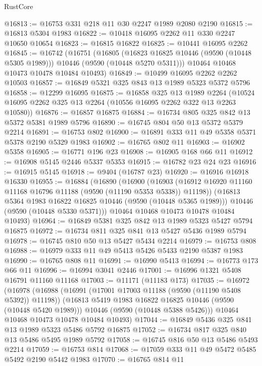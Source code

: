 \begin{lexlean}{RustCore}
\begin{coremodule}
@16813 := @16753 @331 @218 @11 @30 @2247 @1989 @2080 @2190
@16815 := @16813 @5304 @1983
@16822 := @10418 @16095 @2262 @11 @330 @2247 @10650 @10654
@16823 := @16815 @16822
@16825 := @10441 @16095 @2262
@16845 := @16742
    (@16751
      (@16805
        (@16823 @16825 @10446 (@9590 (@10448 @5305 @1989)))
        @10446
        (@9590 (@10448 @5270 @5311)))
      @10464
      @10468
      @10473
      @10478
      @10484
      @10493)
@16849 := @10499 @16095 @2262 @2262 @10503
@16857 := @16849 @5321 @325 @843 @13 @1989 @5323 @5372 @5796
@16858 := @12299 @16095
@16875 := @16858
    @325
    @13
    @1989
    @2264
    (@10524 @16095 @2262 @325 @13 @2264 (@10556 @16095 @2262 @322 @13 @2263 @10580))
@16876 := @16857 @16875
@16884 := @16734 @805 @325 @842 @13 @5372 @5381 @1989 @5796
@16890 := @16745 @804 @50 @13 @5372 @5379 @2214
@16891 := @16753 @802
@16900 := @16891 @333 @11 @49 @5358 @5371 @5378 @2190 @5329 @1983
@16902 := @16765 @802 @11
@16903 := @16902 @5358
@16905 := @16771 @196 @23
@16908 := @16905 @168 @66 @11
@16912 := @16908 @5145 @2446 @5337 @5353
@16915 := @16782 @23 @24 @23
@16916 := @16915 @5145
@16918 := @9404 (@16787 @23)
@16920 := @16916 @16918 @16330
@16955 := @16884
    (@16890
      (@16900
        (@16903 (@16912 @16920 @11160 @11168 @16796 @11188 (@9590 (@11190 @5353 @5338)) @11198))
        (@16813 @5364 @1983 @16822 @16825 @10446 (@9590 (@10448 @5365 @1989)))
        @10446
        (@9590 (@10448 @5330 @5371)))
      @10464
      @10468
      @10473
      @10478
      @10484
      @10493)
@16964 := @16849 @5381 @325 @842 @13 @1989 @5323 @5427 @5794 @16875
@16972 := @16734 @811 @325 @841 @13 @5427 @5436 @1989 @5794
@16978 := @16745 @810 @50 @13 @5427 @5434 @2214
@16979 := @16753 @808
@16988 := @16979 @333 @11 @49 @5413 @5426 @5433 @2190 @5387 @1983
@16990 := @16765 @808 @11
@16991 := @16990 @5413
@16994 := @16773 @173 @66 @11
@16996 := @16994 @3041 @2446
@17001 := @16996 @1321 @5408 @16791 @11160 @11168
@17003 := @11171 (@11183 @173)
@17035 := @16972
    (@16978
      (@16988
        (@16991 (@17001 @17003 @11188 (@9590 (@11190 @5408 @5392)) @11198))
        (@16813 @5419 @1983 @16822 @16825 @10446 (@9590 (@10448 @5420 @1989)))
        @10446
        (@9590 (@10448 @5388 @5426)))
      @10464
      @10468
      @10473
      @10478
      @10484
      @10493)
@17044 := @16849 @5436 @325 @841 @13 @1989 @5323 @5486 @5792 @16875
@17052 := @16734 @817 @325 @840 @13 @5486 @5495 @1989 @5792
@17058 := @16745 @816 @50 @13 @5486 @5493 @2214
@17059 := @16753 @814
@17068 := @17059 @333 @11 @49 @5472 @5485 @5492 @2190 @5442 @1983
@17070 := @16765 @814 @11

\end{coremodule}
\end{lexlean}
